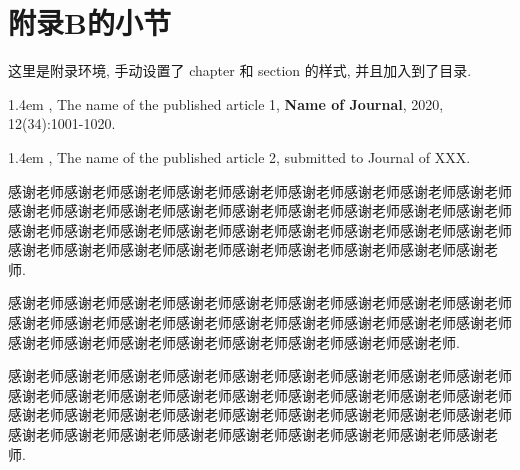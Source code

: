 \documentclass[master]{shnuthesis}
\begin{document}
\section{附录B的小节}

这里是附录环境, 手动设置了 chapter 和 section 的样式, 并且加入到了目录.





\begin{researchpage}
\hangindent 1.4em
,  The name of the published article 1, {\bf  Name of Journal}, 2020, 12(34):1001-1020.

\hangindent 1.4em
, The name of the published article 2, submitted to
Journal of XXX.

\end{researchpage}




\begin{thankpage}
\setlength{\baselineskip}{24pt}

感谢老师感谢老师感谢老师感谢老师感谢老师感谢老师感谢老师感谢老师感谢老师感谢老师感谢老师感谢老师感谢老师感谢老师感谢老师感谢老师感谢老师感谢老师感谢老师感谢老师感谢老师感谢老师感谢老师感谢老师感谢老师感谢老师感谢老师感谢老师感谢老师感谢老师感谢老师感谢老师感谢老师感谢老师感谢老师感谢老师.

感谢老师感谢老师感谢老师感谢老师感谢老师感谢老师感谢老师感谢老师感谢老师感谢老师感谢老师感谢老师感谢老师感谢老师感谢老师感谢老师感谢老师感谢老师感谢老师感谢老师感谢老师感谢老师感谢老师感谢老师感谢老师感谢老师.

感谢老师感谢老师感谢老师感谢老师感谢老师感谢老师感谢老师感谢老师感谢老师感谢老师感谢老师感谢老师感谢老师感谢老师感谢老师感谢老师感谢老师感谢老师感谢老师感谢老师感谢老师感谢老师感谢老师感谢老师感谢老师感谢老师感谢老师感谢老师感谢老师感谢老师感谢老师感谢老师感谢老师感谢老师感谢老师感谢老师.


\end{thankpage}
\end{document}
